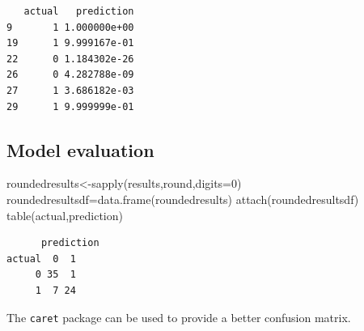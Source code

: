\documentclass[
  letterpaper,
  DIV=11,
  numbers=noendperiod,
  oneside]{scrartcl}
\newenvironment{Shaded}{\begin{snugshade}}{\end{snugshade}}
\newcommand{\AttributeTok}[1]{\textcolor[rgb]{0.40,0.45,0.13}{#1}}
\newcommand{\DecValTok}[1]{\textcolor[rgb]{0.68,0.00,0.00}{#1}}
\newcommand{\FunctionTok}[1]{\textcolor[rgb]{0.28,0.35,0.67}{#1}}
\newcommand{\NormalTok}[1]{\textcolor[rgb]{0.00,0.23,0.31}{#1}}
\newcommand{\OtherTok}[1]{\textcolor[rgb]{0.00,0.23,0.31}{#1}}
\newcommand{\SpecialCharTok}[1]{\textcolor[rgb]{0.37,0.37,0.37}{#1}}
\newcommand{\StringTok}[1]{\textcolor[rgb]{0.13,0.47,0.30}{#1}}
\begin{document}
\begin{Shaded}
\end{Shaded}

\begin{verbatim}
   actual   prediction
9       1 1.000000e+00
19      1 9.999167e-01
22      0 1.184302e-26
26      0 4.282788e-09
27      1 3.686182e-03
29      1 9.999999e-01
\end{verbatim}

\subsection{Model evaluation}\label{model-evaluation}

\begin{Shaded}
\begin{Highlighting}[]
\NormalTok{roundedresults}\OtherTok{\textless{}{-}}\FunctionTok{sapply}\NormalTok{(results,round,}\AttributeTok{digits=}\DecValTok{0}\NormalTok{)}
\NormalTok{roundedresultsdf}\OtherTok{=}\FunctionTok{data.frame}\NormalTok{(roundedresults)}
\FunctionTok{attach}\NormalTok{(roundedresultsdf)}
\FunctionTok{table}\NormalTok{(actual,prediction)}
\end{Highlighting}
\end{Shaded}

\begin{verbatim}
      prediction
actual  0  1
     0 35  1
     1  7 24
\end{verbatim}

The \texttt{caret} package can be used to provide a better confusion
matrix.
\end{document}
